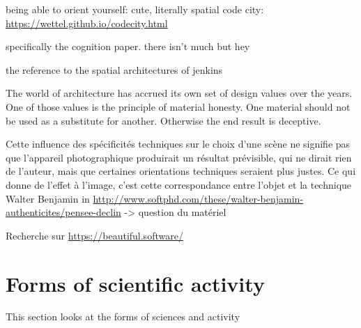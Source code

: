 


being able to orient yourself: cute, literally spatial code city: \url{https://wettel.github.io/codecity.html}

specifically the cognition paper. there isn't much but hey

the reference to the spatial architectures of jenkins




The world of architecture has accrued its own set of design values over the years. One of those values is the principle of material honesty. One material should not be used as a substitute for another. Otherwise the end result is deceptive.

Cette influence des spécificités techniques sur le choix d'une scène ne signifie pas que l'appareil photographique produirait un résultat prévisible, qui ne dirait rien de l'auteur, mais que certaines orientations techniques seraient plus justes. Ce qui donne de l'effet à l'image, c'est cette correspondance entre l'objet et la technique Walter Benjamin in \url{http://www.softphd.com/these/walter-benjamin-authenticites/pensee-declin} -> question du matériel

Recherche sur \url{https://beautiful.software/}


\spacer

\section{Forms of scientific activity}
\label{sec:aesthetic-scientific}

This section looks at the forms of sciences and activity

